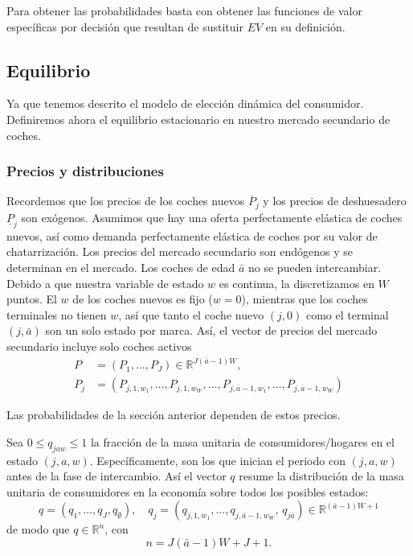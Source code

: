 \documentclass{article}
\begin{document}
Para obtener las probabilidades basta con obtener las funciones de valor específicas por decisión que resultan de sustituir $EV$ en su definición.

\subsection{Equilibrio}

Ya que tenemos descrito el modelo de elección dinámica del consumidor. Definiremos ahora el equilibrio estacionario en nuestro mercado secundario de coches. 

\subsubsection{Precios y distribuciones}

Recordemos que los precios de los coches nuevos $\overline{P}_j$ y los precios de deshuesadero $\underline{P}_j$ son exógenos. Asumimos que hay una oferta perfectamente elástica de coches nuevos, así como demanda perfectamente elástica de coches por su valor de chatarrización. Los precios del mercado secundario son endógenos y se determinan en el mercado. Los coches de edad $\bar{a}$ no se pueden intercambiar. Debido a que nuestra variable de estado $w$ es continua, la discretizamos en $W$ puntos. El $w$ de los coches nuevos es fijo ($w=0$), mientras que los coches terminales no tienen $w$, así que tanto el coche nuevo $(j,0)$ como el terminal $(j,\bar{a})$ son un solo estado por marca. Así, el vector de precios del mercado secundario incluye solo coches activos
$$\begin{aligned}P&=(P_1,\dots,P_J)\in\mathbb{R}^{J(\bar{a}-1)W},\\ P_j&=(P_{j,1,w_1},\dots,P_{j,1,w_W},\dots,P_{j,\bar{a}-1,w_1},\dots,P_{j,\bar{a}-1,w_W})\end{aligned}$$

Las probabilidades de la sección anterior dependen de estos precios.

Sea $0\le q_{jaw} \le 1$ la fracción de la masa unitaria de consumidores/hogares en el estado $(j,a,w)$. Específicamente, son los que inician el periodo con $(j,a,w)$ antes de la fase de intercambio. Así el vector $q$ resume la distribución de la masa unitaria de consumidores en la economía sobre todos los posibles estados:
$$q=(q_1,\dots,q_J,q_{\emptyset}),\quad q_j=(q_{j,1,w_1},\dots,q_{j,\bar{a}-1,w_W},\,q_{j\bar{a}})\in\mathbb{R}^{(\bar{a}-1)W+1}$$
de modo que $q\in\mathbb{R}^{n}$, con
$$n=J(\bar{a}-1)W+J+1 .$$
\end{document}
